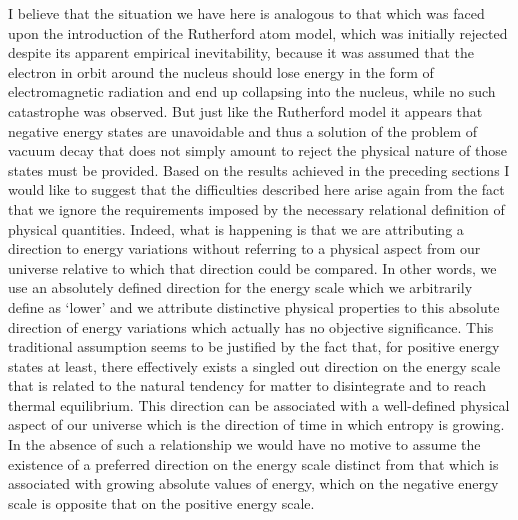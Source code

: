 \documentclass[notitlepage,12pt]{report}
\begin{document}
I believe that the situation we have here is analogous to that which was faced upon the introduction of the Rutherford atom model, which was initially rejected despite its apparent empirical inevitability, because it was assumed that the electron in orbit around the nucleus should lose energy in the form of electromagnetic radiation and end up collapsing into the nucleus, while no such catastrophe was observed. But just like the Rutherford model it appears that negative energy states are unavoidable and thus a solution of the problem of vacuum decay that does not simply amount to reject the physical nature of those states must be provided. Based on the results achieved in the preceding sections I would like to suggest that the difficulties described here arise again from the fact that we ignore the requirements imposed by the necessary relational definition of physical quantities. Indeed, what is happening is that we are attributing a direction to energy variations without referring to a physical aspect from our universe relative to which that direction could be compared. In other words, we use an absolutely defined direction for the energy scale which we arbitrarily define as `lower' and we attribute distinctive physical properties to this absolute direction of energy variations which actually has no objective significance. This traditional assumption seems to be justified by the fact that, for positive energy states at least, there effectively exists a singled out direction on the energy scale that is related to the natural tendency for matter to disintegrate and to reach thermal equilibrium. This direction can be associated with a well-defined physical aspect of our universe which is the direction of time in which entropy is growing. In the absence of such a relationship we would have no motive to assume the existence of a preferred direction on the energy scale distinct from that which is associated with growing absolute values of energy, which on the negative energy scale is opposite that on the positive energy scale.
\end{document}
